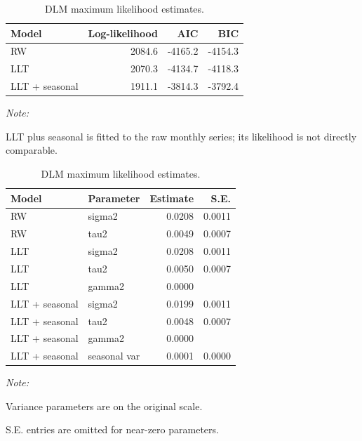 \documentclass[10pt]{article}
\begin{document}
\begin{table}[htb]
\begin{minipage}[t]{0.47\textwidth}
\caption{\label{tab:dlm-fit-table}\label{tbl:dlm-fit}DLM fit summary.}
\begin{threeparttable}
\begin{tabular}[t]{lrrr}
\toprule
Model & Log-likelihood & AIC & BIC\\
\midrule
RW & 2084.6 & -4165.2 & -4154.3\\
LLT & 2070.3 & -4134.7 & -4118.3\\
LLT + seasonal & 1911.1 & -3814.3 & -3792.4\\
\bottomrule
\end{tabular}
\begin{tablenotes}
\item \textit{Note: }
\item LLT plus seasonal is fitted to the raw monthly series; its likelihood is not directly comparable.
\end{tablenotes}
\end{threeparttable}
\end{minipage}
\hfill
\begin{minipage}[t]{0.47\textwidth}
\caption{\label{tab:dlm-param-table}\label{tbl:dlm-params}DLM maximum likelihood estimates.}
\begin{threeparttable}
\begin{tabular}[t]{llrr}
\toprule
Model & Parameter & Estimate & S.E.\\
\midrule
RW & sigma2 & 0.0208 & 0.0011\\
RW & tau2 & 0.0049 & 0.0007\\
\addlinespace
LLT & sigma2 & 0.0208 & 0.0011\\
LLT & tau2 & 0.0050 & 0.0007\\
LLT & gamma2 & 0.0000 & \\
\addlinespace
LLT + seasonal & sigma2 & 0.0199 & 0.0011\\
LLT + seasonal & tau2 & 0.0048 & 0.0007\\
LLT + seasonal & gamma2 & 0.0000 & \\
LLT + seasonal & seasonal var & 0.0001 & 0.0000\\
\bottomrule
\end{tabular}
\begin{tablenotes}
\item \textit{Note: }
\item Variance parameters are on the original scale.
\item S.E. entries are omitted for near-zero parameters.
\end{tablenotes}
\end{threeparttable}
\end{minipage}
\end{table}
\end{document}
